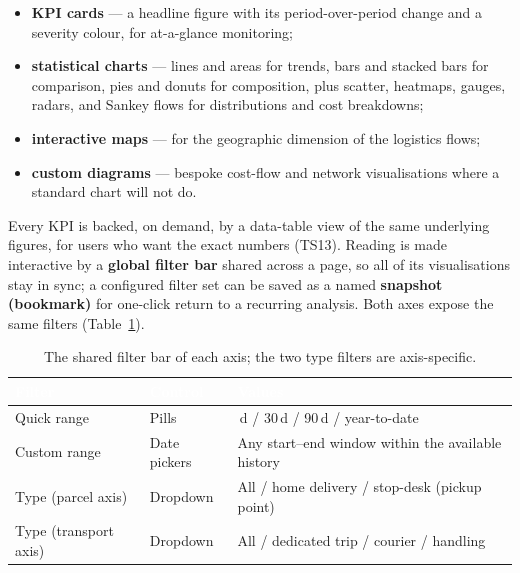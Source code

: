 \begin{itemize}[noitemsep]
    \item \textbf{KPI cards} --- a headline figure with its period-over-period change and a severity
          colour, for at-a-glance monitoring;
    \item \textbf{statistical charts} --- lines and areas for trends, bars and stacked bars for
          comparison, pies and donuts for composition, plus scatter, heatmaps, gauges, radars, and
          Sankey flows for distributions and cost breakdowns;
    \item \textbf{interactive maps} --- for the geographic dimension of the logistics flows;
    \item \textbf{custom diagrams} --- bespoke cost-flow and network visualisations where a standard
          chart will not do.
\end{itemize}

Every KPI is backed, on demand, by a data-table view of the same underlying figures, for users who want
the exact numbers (TS13). Reading is made interactive by a \textbf{global filter bar} shared across a
page, so all of its visualisations stay in sync; a configured filter set can be saved as a named
\textbf{snapshot (bookmark)} for one-click return to a recurring analysis. Both axes expose the same
filters (Table~\ref{tab:ch4-dash-filters}).

\begin{table}[H]
\centering
\caption{The shared filter bar of each axis; the two type filters are axis-specific.}
\label{tab:ch4-dash-filters}
\renewcommand{\arraystretch}{1.3}
\begin{tabularx}{\linewidth}{|>{\raggedright\arraybackslash}p{2.7cm}|>{\raggedright\arraybackslash}p{2.4cm}|>{\raggedright\arraybackslash}X|}
\hline
\rowcolor{tblheader}
\textcolor{white}{\textbf{Filter}} & \textcolor{white}{\textbf{Control}} &
\textcolor{white}{\textbf{Values}} \\
\hline
Quick range & Pills & 7\,d / 30\,d / 90\,d / year-to-date \\
Custom range & Date pickers & Any start--end window within the available history \\
Type (parcel axis) & Dropdown & All / home delivery / stop-desk (pickup point) \\
Type (transport axis) & Dropdown & All / dedicated trip / courier / handling \\
\hline
\end{tabularx}
\end{table}


